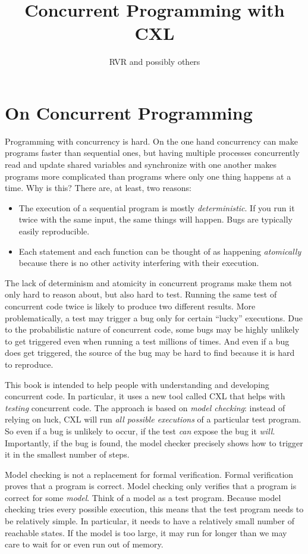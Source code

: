 \documentclass{report}
\title{Concurrent Programming with CXL}
\author{RVR and possibly others}
\begin{document}
\maketitle

\chapter{On Concurrent Programming}

Programming with concurrency is hard.  On the one hand concurrency
can make programs faster than sequential ones, but having multiple
processes concurrently read and update shared variables and
synchronize with one another makes programs more complicated than
programs where only one thing happens at a time.  Why is this?
There are, at least, two reasons:
\begin{itemize}
\item The execution of a sequential program is mostly \emph{deterministic}.
If you run it twice with the same input, the same things will happen.
Bugs are typically easily reproducible.
\item Each statement and each function can be thought of as happening
\emph{atomically} because there is no other activity interfering with
their execution.
\end{itemize}
The lack of determinism and atomicity in concurrent programs make them
not only hard to reason about, but also hard to test.
Running the same test of concurrent code twice is likely to produce
two different results.  More problematically, a test may trigger a
bug only for certain ``lucky'' executions.  Due to the probabilistic
nature of concurrent code, some bugs may be highly unlikely to get
triggered even when running a test millions of times.  And even if
a bug does get triggered, the source of the bug may be hard to find
because it is hard to reproduce.

This book is intended to help people with understanding and
developing concurrent code.  In particular, it uses a new tool
called CXL that helps with \emph{testing} concurrent code.
The approach is based on \emph{model checking}: instead of relying
on luck, CXL will run \emph{all possible executions} of a particular
test program.  So even if a bug is unlikely to occur, if the test
\emph{can} expose the bug it \emph{will}.  Importantly, if the bug is
found, the model checker precisely shows how to trigger it in
the smallest number of steps.

Model checking is not a replacement for formal verification.  Formal
verification proves that a program is correct.  Model checking only
verifies that a program is correct for some \emph{model}.  Think of
a model as a test program.  Because model checking tries every possible
execution, this means that the test program needs to be relatively
simple.  In particular, it needs to have a relatively small number of
reachable states.
If the model is too large, it may run for longer than we may care to
wait for or even run out of memory.
\end{document}
